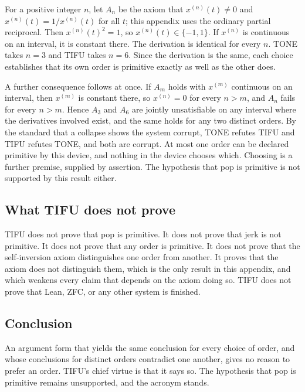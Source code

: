 \documentclass[11pt]{article}
\begin{document}
For a positive integer $n$, let $A_n$ be the axiom that $x^{(n)}(t)\neq0$ and $x^{(n)}(t)=1/x^{(n)}(t)$ for all $t$; this appendix uses the ordinary partial reciprocal. Then $x^{(n)}(t)^2=1$, so $x^{(n)}(t)\in\{-1,1\}$. If $x^{(n)}$ is continuous on an interval, it is constant there. The derivation is identical for every $n$. TONE takes $n=3$ and TIFU takes $n=6$. Since the derivation is the same, each choice establishes that its own order is primitive exactly as well as the other does.

A further consequence follows at once. If $A_m$ holds with $x^{(m)}$ continuous on an interval, then $x^{(m)}$ is constant there, so $x^{(n)}=0$ for every $n>m$, and $A_n$ fails for every $n>m$. Hence $A_3$ and $A_6$ are jointly unsatisfiable on any interval where the derivatives involved exist, and the same holds for any two distinct orders. By the standard that a collapse shows the system corrupt, TONE refutes TIFU and TIFU refutes TONE, and both are corrupt. At most one order can be declared primitive by this device, and nothing in the device chooses which. Choosing is a further premise, supplied by assertion. The hypothesis that pop is primitive is not supported by this result either.

\subsection{What TIFU does not prove}

TIFU does not prove that pop is primitive. It does not prove that jerk is not primitive. It does not prove that any order is primitive. It does not prove that the self-inversion axiom distinguishes one order from another. It proves that the axiom does not distinguish them, which is the only result in this appendix, and which weakens every claim that depends on the axiom doing so. TIFU does not prove that Lean, ZFC, or any other system is finished.

\subsection{Conclusion}

An argument form that yields the same conclusion for every choice of order, and whose conclusions for distinct orders contradict one another, gives no reason to prefer an order. TIFU's chief virtue is that it says so. The hypothesis that pop is primitive remains unsupported, and the acronym stands.
\end{document}
